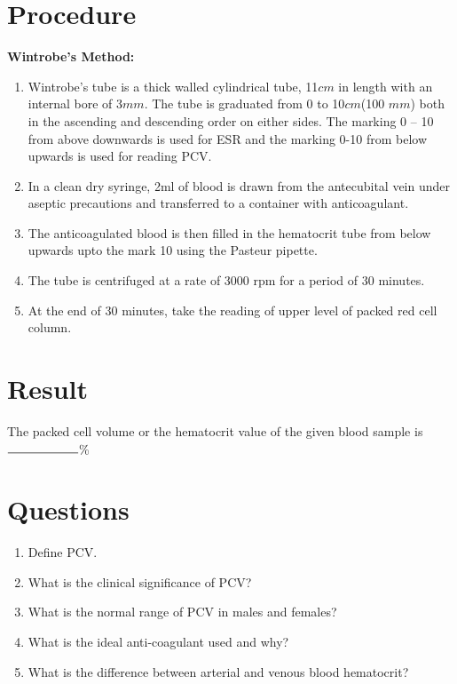 \documentclass[a4paper,12pt,openany,oneside]{book}
\begin{document}
													\section*{Procedure}
													\textbf{Wintrobe's Method:}\newline
													\begin{enumerate}
														\item{Wintrobe’s tube is a thick walled cylindrical tube, 11$cm$ in length with an internal bore of 3$mm$. The tube is graduated from 0 to 10$cm$(100 $mm$) both in the ascending and descending order on either sides. The marking 0 – 10 from above downwards is used for ESR and the marking 0-10 from below upwards is used for reading PCV.}
														\item{In a clean dry syringe, 2ml of blood is drawn from the antecubital vein under aseptic precautions and transferred to a container with anticoagulant.}
														\item{The anticoagulated blood is then filled in the hematocrit tube from below upwards upto the mark 10 using the Pasteur pipette.}
														\item{The tube is centrifuged at a rate of 3000 rpm for a period of 30 minutes.}
														\item{At the end of 30 minutes, take the reading of upper level of packed red cell column.}
													\end{enumerate}
													\section*{Result}
													The packed cell volume or the hematocrit value of the given blood sample is $\rule{2cm}{.5pt}$\%
													\section*{Questions}
													\begin{enumerate}
														\item{Define PCV.}
														\item{What is the clinical significance of PCV?}
														\item{What is the normal range of PCV in males and females?}
														\item{What is the ideal anti-coagulant used and why?}
														\item{What is the difference between arterial and venous blood hematocrit?}
													\end{enumerate}
\end{document}
